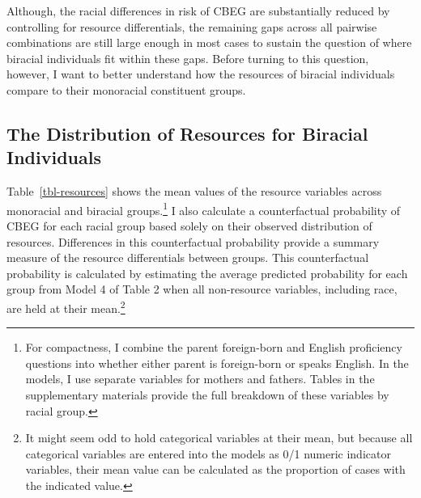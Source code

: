 \documentclass[
  letterpaper,
  DIV=11,
  numbers=noendperiod]{scrartcl}
\begin{document}
Although, the racial differences in risk of CBEG are substantially
reduced by controlling for resource differentials, the remaining gaps
across all pairwise combinations are still large enough in most cases to
sustain the question of where biracial individuals fit within these
gaps. Before turning to this question, however, I want to better
understand how the resources of biracial individuals compare to their
monoracial constituent groups.

\hypertarget{the-distribution-of-resources-for-biracial-individuals}{%
\subsection{The Distribution of Resources for Biracial
Individuals}\label{the-distribution-of-resources-for-biracial-individuals}}

Table~\ref{tbl-resources} shows the mean values of the resource
variables across monoracial and biracial groups.\footnote{For
  compactness, I combine the parent foreign-born and English proficiency
  questions into whether either parent is foreign-born or speaks
  English. In the models, I use separate variables for mothers and
  fathers. Tables in the supplementary materials provide the full
  breakdown of these variables by racial group.} I also calculate a
counterfactual probability of CBEG for each racial group based solely on
their observed distribution of resources. Differences in this
counterfactual probability provide a summary measure of the resource
differentials between groups. This counterfactual probability is
calculated by estimating the average predicted probability for each
group from Model 4 of Table 2 when all non-resource variables, including
race, are held at their mean.\footnote{It might seem odd to hold
  categorical variables at their mean, but because all categorical
  variables are entered into the models as 0/1 numeric indicator
  variables, their mean value can be calculated as the proportion of
  cases with the indicated value.}
\end{document}
